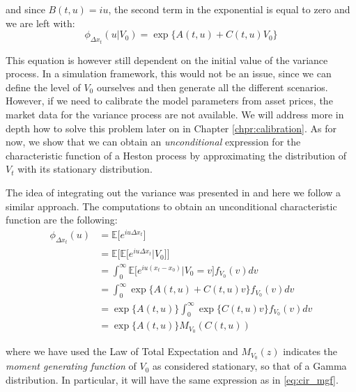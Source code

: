 and since $B(t,u)  = i u$, the second term in the exponential is equal to zero and we are left with:
\begin{equation}
\label{eq:chf_V0}
\phi_{\Delta x_t}(u|V_0) =  \exp\{A(t,u) + C(t,u) V_0\}
\end{equation}




This equation is however still dependent on the initial value of the variance process. In a simulation framework, this would not be an issue, since we can define the level of $V_0$ ourselves and then generate all the different scenarios. However, if we need to calibrate the model parameters from asset prices, the market data for the variance process are not available. We will address more in depth how to solve this problem later on in Chapter \ref{chpr:calibration}. As for now, we show that we can obtain an \textit{unconditional} expression for the characteristic function of a Heston process by approximating the distribution of $V_t$ with its stationary distribution.

The idea of integrating out the variance was presented in \citep{DRAGULESCU2002} and here we follow a similar approach.
The computations to obtain an unconditional characteristic function are the following:
\begin{equation*}
\begin{split}
	\phi_{\Delta x_t}(u) &= \mathbb{E}\big[e^{i u \Delta x_t} \big] \\
	&= \mathbb{E}\big[ \mathbb{E}\big[ e^{i u \Delta x_t} | V_0\big] \big]\\
	&=  \int_{0}^{\infty} \mathbb{E}\big[e^{i u ( x_t - x_0)}|V_0 = v \big] f_{V_0}(v) dv \\
	&= \int_{0}^{\infty} \exp\{A(t,u) + C(t,u) v\} f_{V_0}(v) dv \\
	&=  \exp\{A(t,u)\} \int_{0}^{\infty}  \exp \{C(t,u) v\} f_{V_0}(v) dv\\
	&= \exp\{A(t,u) \} M_{V_0}(C(t,u))
\end{split}
\end{equation*}

where we have used the Law of Total Expectation and $M_{V_0}(z)$ indicates the \textit{moment generating function} of $V_0$ as considered stationary, so that of a Gamma distribution. In particular, it will have the same expression as in \eqref{eq:cir_mgf}.




